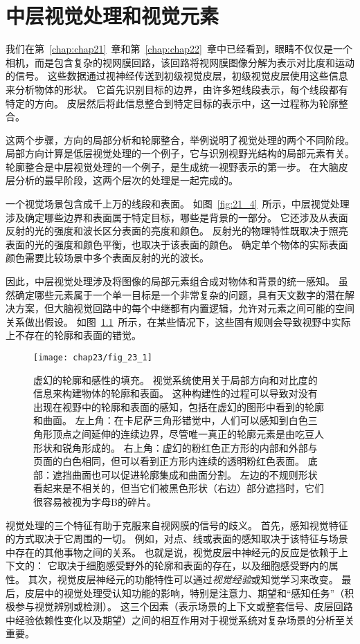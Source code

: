 \chapter{中层视觉处理和视觉元素} \label{chap:chap23}

我们在第~\ref{chap:chap21}~章和第~\ref{chap:chap22}~章中已经看到，眼睛不仅仅是一个相机，而是包含复杂的视网膜回路，该回路将视网膜图像分解为表示对比度和运动的信号。
这些数据通过视神经传送到初级视觉皮层，初级视觉皮层使用这些信息来分析物体的形状。
它首先识别目标的边界，由许多短线段表示，每个线段都有特定的方向。
皮层然后将此信息整合到特定目标的表示中，这一过程称为轮廓整合。


这两个步骤，方向的局部分析和轮廓整合，举例说明了视觉处理的两个不同阶段。
局部方向计算是低层视觉处理的一个例子，它与识别视野光结构的局部元素有关。
轮廓整合是中层视觉处理的一个例子，是生成统一视野表示的第一步。
在大脑皮层分析的最早阶段，这两个层次的处理是一起完成的。
 

一个视觉场景包含成千上万的线段和表面。
如图~\ref{fig:21_4}~所示，中层视觉处理涉及确定哪些边界和表面属于特定目标，哪些是背景的一部分。
它还涉及从表面反射的光的强度和波长区分表面的亮度和颜色。
反射光的物理特性既取决于照亮表面的光的强度和颜色平衡，也取决于该表面的颜色。
确定单个物体的实际表面颜色需要比较场景中多个表面反射的光的波长。


因此，中层视觉处理涉及将图像的局部元素组合成对物体和背景的统一感知。
虽然确定哪些元素属于一个单一目标是一个非常复杂的问题，具有天文数字的潜在解决方案，但大脑视觉回路中的每个中继都有内置逻辑，允许对元素之间可能的空间关系做出假设。
如图~\ref{fig:23_1}~所示，在某些情况下，这些固有规则会导致视野中实际上不存在的轮廓和表面的错觉。


\begin{figure}[htbp]
	\centering
	\texttt{[image: chap23/fig\_23\_1]}
	\caption{虚幻的轮廓和感性的填充。
		视觉系统使用关于局部方向和对比度的信息来构建物体的轮廓和表面。
		这种构建性的过程可以导致对没有出现在视野中的轮廓和表面的感知，包括在虚幻的图形中看到的轮廓和曲面。
		左上角：在卡尼萨三角形错觉中，人们可以感知到白色三角形顶点之间延伸的连续边界，尽管唯一真正的轮廓元素是由吃豆人形状和锐角形成的。
		右上角：虚幻的粉红色正方形的内部和外部与页面的白色相同，但可以看到正方形内连续的透明粉红色表面。
		底部：遮挡曲面也可以促进轮廓集成和曲面分割。
		左边的不规则形状看起来是不相关的，但当它们被黑色形状（右边）部分遮挡时，它们很容易被视为字母B的碎片。}
	\label{fig:23_1}
\end{figure}


视觉处理的三个特征有助于克服来自视网膜的信号的歧义。
首先，感知视觉特征的方式取决于它周围的一切。
例如，对点、线或表面的感知取决于该特征与场景中存在的其他事物之间的关系。
也就是说，视觉皮层中神经元的反应是依赖于上下文的：
它取决于细胞感受野外的轮廓和表面的存在，以及细胞感受野内的属性。
其次，视觉皮层神经元的功能特性可以通过\textit{视觉经验}或知觉学习来改变。
最后，皮层中的视觉处理受认知功能的影响，特别是注意力、期望和“感知任务”（积极参与视觉辨别或检测）。
这三个因素（表示场景的上下文或整套信号、皮层回路中经验依赖性变化以及期望）之间的相互作用对于视觉系统对复杂场景的分析至关重要。


